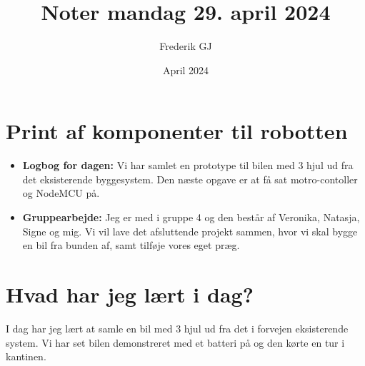 \documentclass{article}
\title{Noter mandag 29. april 2024}
\author{Frederik GJ}
\date{April 2024}
\begin{document}
\maketitle

\section{Print af komponenter til robotten}

\begin{itemize}
    \item \textbf{Logbog for dagen:} Vi har samlet en prototype til bilen med 3 hjul ud fra det eksisterende byggesystem. Den næste opgave er at få sat motro-contoller og NodeMCU på. 
    \item \textbf{Gruppearbejde:} Jeg er med i gruppe 4 og den består af Veronika, Natasja, Signe og mig. Vi vil lave det afsluttende projekt sammen, hvor vi skal bygge en bil fra bunden af, samt tilføje vores eget præg. 
\end{itemize}

\section{Hvad har jeg lært i dag?}
I dag har jeg lært at samle en bil med 3 hjul ud fra det i forvejen eksisterende system. Vi har set bilen demonstreret med et batteri på og den kørte en tur i kantinen. 
\end{document}
